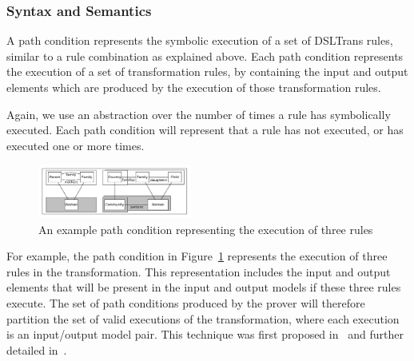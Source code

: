 \subsubsection{Syntax and Semantics}
\label{subsubsec:path_condition_creation}

A path condition represents the symbolic execution of a set of DSLTrans rules, similar to a rule combination as explained above. Each path condition represents the execution of a set of transformation rules, by containing the input and output elements which are produced by the execution of those transformation rules.

Again, we use an abstraction over the number of times a rule has symbolically executed. Each path condition will represent that a rule has not executed, or has executed one or more times.

   \begin{figure}[t]
     \begin{center}
       \includegraphics[width=0.45\textwidth]{figures/path_conditions/pc.pdf}
       \caption{An example path condition representing the execution of three rules}
       \label{fig:pc_first}
     \end{center}
     \vspace{-0.20in}
   \end{figure}
   
For example, the path condition in Figure~\ref{fig:pc_first} represents the execution of three rules in the transformation. This representation includes the input and output elements that will be present in the input and output models if these three rules execute. The set of path conditions produced by the prover will therefore partition the set of valid executions of the transformation, where each execution is an input/output model pair. This technique was first proposed in~\cite{Lucio2010} and further detailed in~\cite{Lucio2014}.





